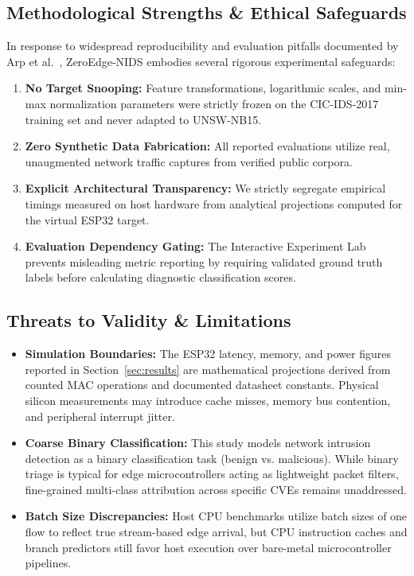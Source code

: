 \subsection{Methodological Strengths & Ethical Safeguards}
In response to widespread reproducibility and evaluation pitfalls documented by Arp et al.~\cite{arp2022dos}, ZeroEdge-NIDS embodies several rigorous experimental safeguards:
\begin{enumerate}
    \item \textbf{No Target Snooping:} Feature transformations, logarithmic scales, and min-max normalization parameters were strictly frozen on the CIC-IDS-2017 training set and never adapted to UNSW-NB15.
    \item \textbf{Zero Synthetic Data Fabrication:} All reported evaluations utilize real, unaugmented network traffic captures from verified public corpora.
    \item \textbf{Explicit Architectural Transparency:} We strictly segregate empirical timings measured on host hardware from analytical projections computed for the virtual ESP32 target.
    \item \textbf{Evaluation Dependency Gating:} The Interactive Experiment Lab prevents misleading metric reporting by requiring validated ground truth labels before calculating diagnostic classification scores.
\end{enumerate}

\subsection{Threats to Validity & Limitations}
\begin{itemize}
    \item \textbf{Simulation Boundaries:} The ESP32 latency, memory, and power figures reported in Section~\ref{sec:results} are mathematical projections derived from counted MAC operations and documented datasheet constants. Physical silicon measurements may introduce cache misses, memory bus contention, and peripheral interrupt jitter.
    \item \textbf{Coarse Binary Classification:} This study models network intrusion detection as a binary classification task (benign vs. malicious). While binary triage is typical for edge microcontrollers acting as lightweight packet filters, fine-grained multi-class attribution across specific CVEs remains unaddressed.
    \item \textbf{Batch Size Discrepancies:} Host CPU benchmarks utilize batch sizes of one flow to reflect true stream-based edge arrival, but CPU instruction caches and branch predictors still favor host execution over bare-metal microcontroller pipelines.
\end{itemize}
